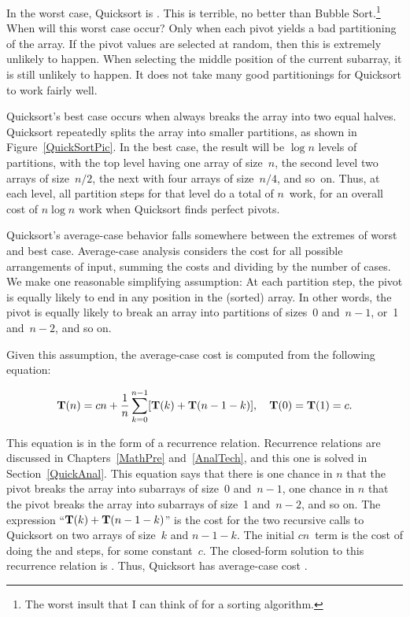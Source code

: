 In the worst case, Quicksort is \Thetantwo.
This is terrible, no better than Bubble Sort.\footnote{The worst
insult that I can think of for a sorting algorithm.}
When will this worst case occur?
Only when each pivot yields a bad partitioning of the array.
If the pivot values are selected at random, then this is extremely
unlikely to happen.
When selecting the middle position of the current subarray, it is
still unlikely to happen.
It does not take many good partitionings for Quicksort to
work fairly well.

Quicksort's best case occurs when  always breaks the
array into two equal halves.
Quicksort repeatedly splits the array into
smaller partitions, as shown in Figure~\ref{QuickSortPic}.
In the best case, the result will be \(\log n\) levels of partitions,
with the top level having one array of size~\(n\), the second level
two arrays of size~\(n/2\), the next with four arrays of size~\(n/4\),
and so~on.
Thus, at each level, all partition steps for that level do a total of
\(n\)~work, for an overall cost of $n \log n$ work when Quicksort
finds perfect pivots.

Quicksort's average-case behavior falls somewhere
between the extremes of worst and best case.
Average-case analysis considers the cost for all possible arrangements
of input, summing the costs and dividing by the number of cases.
We make one reasonable simplifying assumption:
At each partition step, the pivot is
equally likely to end in any position in the (sorted) array.
In other words, the pivot is equally likely to break an array into
partitions of sizes~0 and~\(n-1\), or~1 and~\(n-2\), and so on.

Given this assumption, the average-case cost is computed from the
following equation:

\[{\bf T}(n) = cn + \frac{1}{n}\sum_{k=0}^{n-1}[{\bf T}(k) +
{\bf T}(n - 1 - k)],\index{summation}
\quad {\bf T}(0) = {\bf T}(1) = c.\]

\noindent This equation is in the form of a
recurrence relation.
Recurrence relations are discussed in Chapters~\ref{MathPre}
and~\ref{AnalTech},
and this one is solved in Section~\ref{QuickAnal}.
This equation says that there is one chance in \(n\) that the pivot
breaks the array into subarrays of size~0 and~\(n-1\),
one chance in \(n\) that the pivot breaks the array into
subarrays of size~1 and~\(n-2\), and so on.
The expression ``\( {\bf T}(k) + {\bf T}(n - 1 - k)\)'' is the cost
for the two recursive calls to Quicksort on two arrays of size~\(k\)
and \(n-1-k\).
The initial \(cn\)~term is the cost of doing the
 and  steps, for some constant~\(c\).
The closed-form solution to this recurrence relation is
\Thetanlogn.
Thus, Quicksort has average-case cost \Thetanlogn.

